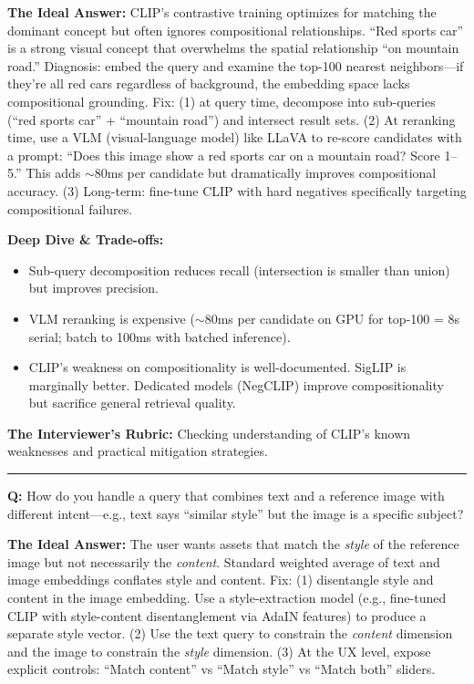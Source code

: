 \textbf{The Ideal Answer:} CLIP's contrastive training optimizes for matching the dominant concept but often ignores compositional relationships. ``Red sports car'' is a strong visual concept that overwhelms the spatial relationship ``on mountain road.'' Diagnosis: embed the query and examine the top-100 nearest neighbors---if they're all red cars regardless of background, the embedding space lacks compositional grounding. Fix: (1) at query time, decompose into sub-queries (``red sports car'' + ``mountain road'') and intersect result sets. (2) At reranking time, use a VLM (visual-language model) like LLaVA to re-score candidates with a prompt: ``Does this image show a red sports car on a mountain road? Score 1--5.'' This adds $\sim$80ms per candidate but dramatically improves compositional accuracy. (3) Long-term: fine-tune CLIP with hard negatives specifically targeting compositional failures.

\textbf{Deep Dive \& Trade-offs:}
\begin{itemize}
  \item Sub-query decomposition reduces recall (intersection is smaller than union) but improves precision.
  \item VLM reranking is expensive ($\sim$80ms per candidate on GPU for top-100 = 8s serial; batch to 100ms with batched inference).
  \item CLIP's weakness on compositionality is well-documented. SigLIP is marginally better. Dedicated models (NegCLIP) improve compositionality but sacrifice general retrieval quality.
\end{itemize}

\textbf{The Interviewer's Rubric:} Checking understanding of CLIP's known weaknesses and practical mitigation strategies.

\bigskip\hrule\bigskip

\textbf{Q:} How do you handle a query that combines text and a reference image with different intent---e.g., text says ``similar style'' but the image is a specific subject?

\textbf{The Ideal Answer:} The user wants assets that match the \emph{style} of the reference image but not necessarily the \emph{content}. Standard weighted average of text and image embeddings conflates style and content. Fix: (1) disentangle style and content in the image embedding. Use a style-extraction model (e.g., fine-tuned CLIP with style-content disentanglement via AdaIN features) to produce a separate style vector. (2) Use the text query to constrain the \emph{content} dimension and the image to constrain the \emph{style} dimension. (3) At the UX level, expose explicit controls: ``Match content'' vs ``Match style'' vs ``Match both'' sliders.

